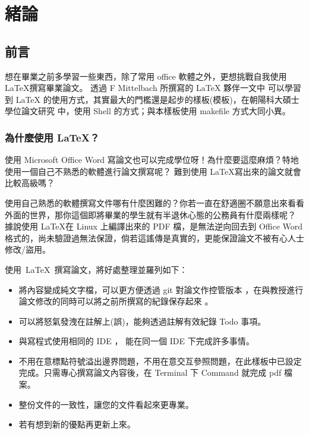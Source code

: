 \chapter{緒論}\label{explanation}


\section{前言}\label{1-1}
想在畢業之前多學習一些東西，除了常用 office 軟體之外，更想挑戰自我使用 \LaTeX 撰寫畢業論文。
透過 F Mittelbach 所撰寫的 LaTeX 夥伴一文中 \cite{mittelbach2004} 可以學習到 LaTeX\cite{the-latex-project} 的使用方式，其實最大的門檻還是起步的樣板(模板)，在朝陽科大碩士學位論文研究 \cite{ShellLATEX} 中，使用 Shell 的方式；與本樣板使用 makefile 方式大同小異。

\subsection{為什麼使用 LaTeX？}
使用 Microsoft Office Word 寫論文也可以完成學位呀！為什麼要這麼麻煩？特地使用一個自己不熟悉的軟體進行論文撰寫呢？
難到使用 \LaTeX 寫出來的論文就會比較高級嗎？

使用自己熟悉的軟體撰寫文件哪有什麼困難的？你若一直在舒適圈不願意出來看看外面的世界，那你這個即將畢業的學生就有半退休心態的公務員有什麼兩樣呢？
據說使用 \LaTeX 在 Linux 上編譯出來的 PDF 檔，是無法逆向回去到 Office Word 格式的，尚未驗證過無法保證，倘若這謠傳是真實的，更能保證論文不被有心人士修改/盜用。

\clearpage

\hbox{使用 LaTeX 撰寫論文，將好處整理並羅列如下：}

\begin{itemize}
\item 將內容變成純文字檔，可以更方便透過 git \cite{git-version-control} \cite{git20190914} 對論文作控管版本 \cite{spinellis2012git}，在與教授進行論文修改的同時可以將之前所撰寫的紀錄保存起來 \cite{chacon2014pro}。
\item 可以將怒氣發洩在註解上(誤)，能夠透過註解有效紀錄 Todo 事項。
\item 與寫程式使用相同的 IDE ， 能在同一個 IDE 下完成許多事情。
\item 不用在意標點符號溢出邊界問題，不用在意交互參照問題，在此樣板中已設定完成。只需專心撰寫論文內容後，在 Terminal 下 Command 就完成 pdf 檔案。
\item 整份文件的一致性，讓您的文件看起來更專業。
\item 若有想到新的優點再更新上來。
\end{itemize}

